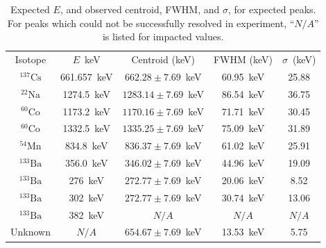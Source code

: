 \documentclass[12pt]{article}
\newcommand{\na}{\xspace$N/A$\xspace}
\newcommand{\CsSrc}{\xspace$\mathrm{^{137}Cs}$\xspace}
\newcommand{\NaSrc}{\xspace$\mathrm{^{22}Na}$\xspace}
\newcommand{\MnSrc}{\xspace$\mathrm{^{54}Mn}$\xspace}
\newcommand{\CoSrc}{\xspace$\mathrm{^{60}Co}$\xspace}
\newcommand{\BaSrc}{\xspace$\mathrm{^{133}Ba}$\xspace}
\begin{document}
\begin{table}
    \centering
    \caption{Expected $E$, and observed centroid, FWHM, and $\sigma$, for expected peaks. For peaks which could not be successfully resolved in experiment, ``\na'' is listed for impacted values.}
    \label{tab:peaks}
    \begin{tabular}{cc|ccc}
Isotope & $E$~keV & Centroid (keV) & FWHM (keV) & $\sigma$~(keV) \\
\CsSrc & 661.657~keV & $662.28\pm7.69$~keV & 60.95~keV & 25.88 \\
\NaSrc & 1274.5~keV & $1283.14\pm7.69$~keV & 86.54~keV & 36.75 \\
\CoSrc & 1173.2~keV & $1170.16\pm7.69$~keV & 71.71~keV & 30.45 \\
\CoSrc & 1332.5~keV & $1335.25\pm7.69$~keV & 75.09~keV & 31.89 \\
\MnSrc & 834.8~keV & $836.37\pm7.69$~keV & 61.02~keV & 25.91 \\
\BaSrc & 356.0~keV & $346.02\pm7.69$~keV & 44.96~keV & 19.09 \\
\BaSrc & 276~keV & $272.77\pm7.69$~keV & 20.06~keV & 8.52 \\
\BaSrc & 302~keV & $272.77\pm7.69$~keV & 30.74~keV & 13.06 \\
\BaSrc & 382~keV & \na & \na & \na \\
Unknown & \na & $654.67\pm7.69$~keV & 13.53~keV & 5.75 \\
        
    \end{tabular}
\end{table}
\end{document}
